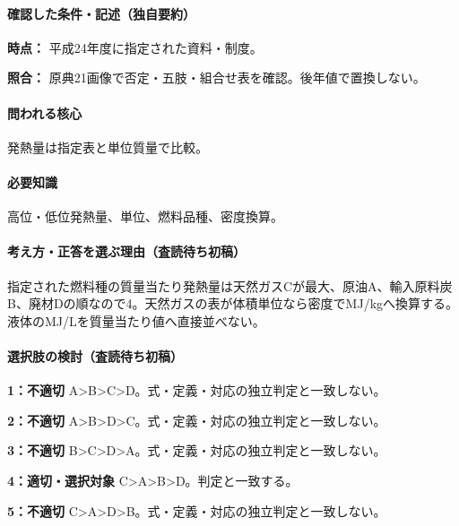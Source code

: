 \paragraph{確認した条件・記述（独自要約）}\mbox{}\par

\noindent\textbf{時点：} 平成24年度に指定された資料・制度。\par

\noindent\textbf{照合：} 原典21画像で否定・五肢・組合せ表を確認。後年値で置換しない。\par

\paragraph{問われる核心} 発熱量は指定表と単位質量で比較。

\paragraph{必要知識} 高位・低位発熱量、単位、燃料品種、密度換算。

\paragraph{考え方・正答を選ぶ理由（査読待ち初稿）} 指定された燃料種の質量当たり発熱量は天然ガスCが最大、原油A、輸入原料炭B、廃材Dの順なので4。天然ガスの表が体積単位なら密度でMJ/kgへ換算する。液体のMJ/Lを質量当たり値へ直接並べない。

\paragraph{選択肢の検討（査読待ち初稿）}\mbox{}\par

\noindent\textbf{1：不適切} A>B>C>D。式・定義・対応の独立判定と一致しない。\par

\noindent\textbf{2：不適切} A>B>D>C。式・定義・対応の独立判定と一致しない。\par

\noindent\textbf{3：不適切} B>C>D>A。式・定義・対応の独立判定と一致しない。\par

\noindent\textbf{4：適切・選択対象} C>A>B>D。判定と一致する。\par

\noindent\textbf{5：不適切} C>A>D>B。式・定義・対応の独立判定と一致しない。\par

